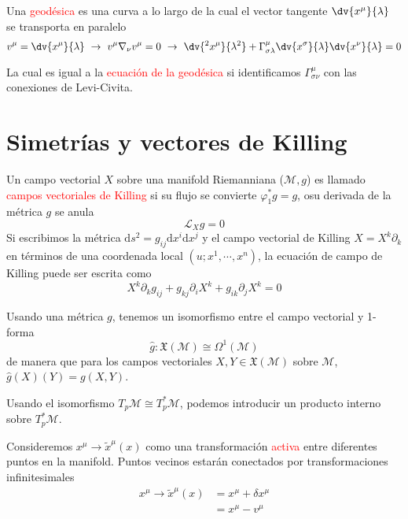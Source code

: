 \documentclass[../main]{subfiles}
\begin{document}
\begin{adjustwidth}{0pt}{-100pt}
Una \textcolor{red}{geodésica} es una curva a lo largo de la cual el vector tangente $\dv{x^{\mu}}{\lambda}$ se transporta en paralelo 
\begin{equation}
    v^{\mu}=\dv{x^{\mu}}{\lambda} \ \rightarrow \ v^{\mu}\nabla_{\nu}v^{\mu}=0 \ \rightarrow \ \dv{^2 x^{\mu}}{\lambda^2}+\Gamma^{\mu}_{\sigma\lambda}\dv{x^{\sigma}}{\lambda}\dv{x^{\nu}}{\lambda}=0
\end{equation}

La cual es igual a la \textcolor{red}{ecuación de la geodésica} si identificamos $\Gamma^{\mu}_{\sigma\nu}$ con las conexiones de Levi-Civita.

\section{Simetrías y vectores de Killing}\label{part4.5}

Un campo vectorial $X$ sobre una manifold Riemanniana ($\mathcal{M}, g$) es llamado \textcolor{red}{campos vectoriales de Killing} si su flujo se convierte $\varphi^*_1 g=g$, osu derivada de la métrica $g$ se anula
\begin{equation}
    \mathcal{L}_X g=0
\end{equation}
Si escribimos la métrica $\mathrm{d}s^2=g_{ij}\mathrm{d}x^{i}\mathrm{d}x^j$ y el campo vectorial de Killing $X=X^k\partial_{k}$ en términos de una coordenada local $(u; x^1, \cdots, x^n)$, la ecuación de campo de Killing puede ser escrita como 
\begin{equation}
    X^k \partial_k g_{ij}+g_{kj}\partial_i X^k+g_{ik}\partial_j X^k=0
\end{equation}

Usando una métrica $g$, tenemos un isomorfismo entre el campo vectorial y 1-forma 
\begin{equation}
    \hat{g}: \mathfrak{X}(\mathcal{M}) \cong \Omega^1(\mathcal{M})
\end{equation}
de manera que para los campos vectoriales $X, Y \in \mathfrak{X}(\mathcal{M})$ sobre $\mathcal{M}$, $\hat{g}(X)(Y)=g(X, Y)$.

Usando el isomorfismo $T_p \mathcal{M} \cong T^*_p \mathcal{M}$, podemos introducir un producto interno sobre $T^*_p\mathcal{M}$.

Consideremos $x^{\mu} \rightarrow \tilde{x}^{\mu}(x)$ como una transformación \textcolor{red}{activa} entre diferentes puntos en la manifold. Puntos vecinos estarán conectados por transformaciones infinitesimales
\begin{equation}
    \begin{aligned}
        x^{\mu} \rightarrow \tilde{x}^{\mu}(x)&=x^{\mu}+\delta x^{\mu}\\
        &=x^{\mu}-v^{\mu}
    \end{aligned}
\end{equation} 


\end{adjustwidth}
\end{document}
